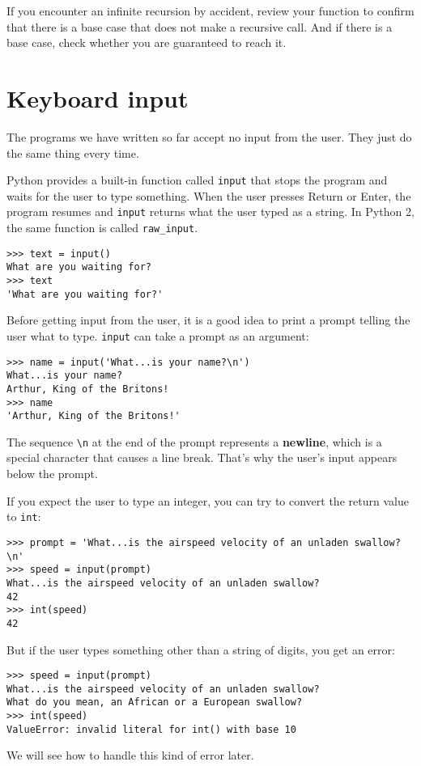 If you encounter an infinite recursion by accident, review
your function to confirm that there is a base case that does not
make a recursive call.  And if there is a base case, check whether
you are guaranteed to reach it.


\section{Keyboard input}

The programs we have written so far accept no input from the user.
They just do the same thing every time.

Python provides a built-in function called {\tt input} that
stops the program and
waits for the user to type something.  When the user presses {\sf
  Return} or {\sf Enter}, the program resumes and \verb"input"
returns what the user typed as a string.  In Python 2, the same
function is called \verb"raw_input".

\begin{verbatim}
>>> text = input()
What are you waiting for?
>>> text
'What are you waiting for?'
\end{verbatim}
%
Before getting input from the user, it is a good idea to print a
prompt telling the user what to type.  \verb"input" can take a
prompt as an argument:

\begin{verbatim}
>>> name = input('What...is your name?\n')
What...is your name?
Arthur, King of the Britons!
>>> name
'Arthur, King of the Britons!'
\end{verbatim}
%
The sequence \verb"\n" at the end of the prompt represents a {\bf
  newline}, which is a special character that causes a line break.
That's why the user's input appears below the prompt.  

If you expect the user to type an integer, you can try to convert
the return value to {\tt int}:

\begin{verbatim}
>>> prompt = 'What...is the airspeed velocity of an unladen swallow?\n'
>>> speed = input(prompt)
What...is the airspeed velocity of an unladen swallow?
42
>>> int(speed)
42
\end{verbatim}
%
But if the user types something other than a string of digits,
you get an error:

\begin{verbatim}
>>> speed = input(prompt)
What...is the airspeed velocity of an unladen swallow?
What do you mean, an African or a European swallow?
>>> int(speed)
ValueError: invalid literal for int() with base 10
\end{verbatim}
%
We will see how to handle this kind of error later.


